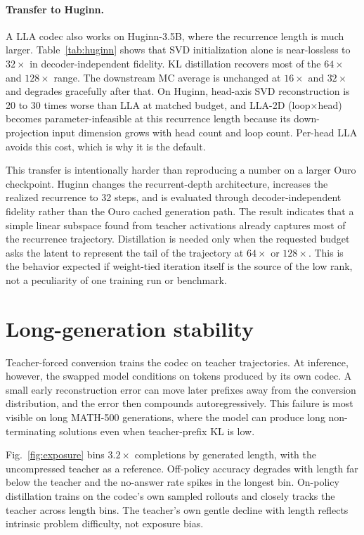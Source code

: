 \documentclass[10pt]{article}
\newcommand{\lla}{LLA}
\begin{document}
\paragraph{Transfer to Huginn.}
A \lla{} codec also works on Huginn-3.5B, where the recurrence length is much larger. Table~\ref{tab:huginn} shows that SVD initialization alone is near-lossless to $32\times$ in decoder-independent fidelity. KL distillation recovers most of the $64\times$ and $128\times$ range. The downstream MC average is unchanged at $16\times$ and $32\times$ and degrades gracefully after that. On Huginn, head-axis SVD reconstruction is 20 to 30 times worse than \lla{} at matched budget, and \lla{}-2D (loop$\times$head) becomes parameter-infeasible at this recurrence length because its down-projection input dimension grows with head count and loop count. Per-head \lla{} avoids this cost, which is why it is the default.

This transfer is intentionally harder than reproducing a number on a larger Ouro checkpoint. Huginn changes the recurrent-depth architecture, increases the realized recurrence to 32 steps, and is evaluated through decoder-independent fidelity rather than the Ouro cached generation path. The result indicates that a simple linear subspace found from teacher activations already captures most of the recurrence trajectory. Distillation is needed only when the requested budget asks the latent to represent the tail of the trajectory at $64\times$ or $128\times$. This is the behavior expected if weight-tied iteration itself is the source of the low rank, not a peculiarity of one training run or benchmark.
\TableHuginn

\section{Long-generation stability}
\label{sec:onpolicy}
Teacher-forced conversion trains the codec on teacher trajectories. At inference, however, the swapped model conditions on tokens produced by its own codec. A small early reconstruction error can move later prefixes away from the conversion distribution, and the error then compounds autoregressively. This failure is most visible on long MATH-500 generations, where the model can produce long non-terminating solutions even when teacher-prefix KL is low.

\FigureExposure
Fig.~\ref{fig:exposure} bins $3.2\times$ completions by generated length, with the uncompressed teacher as a reference. Off-policy accuracy degrades with length far below the teacher and the no-answer rate spikes in the longest bin. On-policy distillation trains on the codec's own sampled rollouts and closely tracks the teacher across length bins. The teacher's own gentle decline with length reflects intrinsic problem difficulty, not exposure bias.
\end{document}
